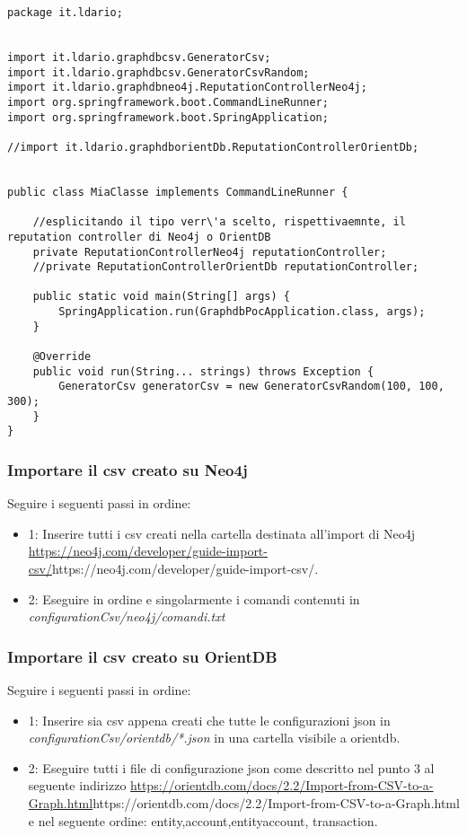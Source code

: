 \begin{lstlisting}
package it.ldario;


import it.ldario.graphdbcsv.GeneratorCsv;
import it.ldario.graphdbcsv.GeneratorCsvRandom;
import it.ldario.graphdbneo4j.ReputationControllerNeo4j;
import org.springframework.boot.CommandLineRunner;
import org.springframework.boot.SpringApplication;

//import it.ldario.graphdborientDb.ReputationControllerOrientDb;


public class MiaClasse implements CommandLineRunner {

    //esplicitando il tipo verr\'a scelto, rispettivaemnte, il reputation controller di Neo4j o OrientDB
    private ReputationControllerNeo4j reputationController;
    //private ReputationControllerOrientDb reputationController;

    public static void main(String[] args) {
        SpringApplication.run(GraphdbPocApplication.class, args);
    }

    @Override
    public void run(String... strings) throws Exception {
        GeneratorCsv generatorCsv = new GeneratorCsvRandom(100, 100, 300);
    }
}
\end{lstlisting}

\subsubsection{Importare il csv creato su Neo4j}
Seguire i seguenti passi in ordine:
\begin{itemize}
\item{1:} Inserire tutti i csv creati nella cartella destinata all'import di Neo4j\\ \url{https://neo4j.com/developer/guide-import-csv/}{https://neo4j.com/developer/guide-import-csv/}.
\item{2:} Eseguire in ordine e singolarmente i comandi contenuti in \textit{configurationCsv/neo4j/comandi.txt}
\end{itemize}

\subsubsection{Importare il csv creato su OrientDB}
Seguire i seguenti passi in ordine:
\begin{itemize}
\item{1:} Inserire sia csv appena creati che tutte le configurazioni json in \textit{configurationCsv/orientdb/*.json} in una cartella visibile a orientdb.
\item{2:} Eseguire tutti i file di configurazione json come descritto nel punto 3 al seguente indirizzo \url{https://orientdb.com/docs/2.2/Import-from-CSV-to-a-Graph.html}{https://orientdb.com/docs/2.2/Import-from-CSV-to-a-Graph.html} e nel seguente ordine: entity,account,entity\textunderscore account, transaction.
\end{itemize}






